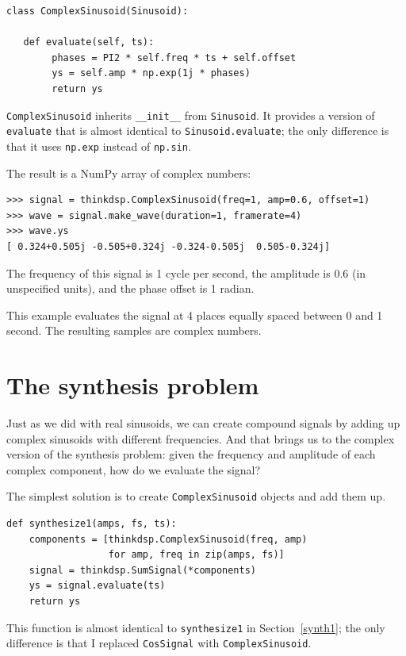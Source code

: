 \documentclass[12pt]{book}
\begin{document}
\begin{verbatim}
class ComplexSinusoid(Sinusoid):

   def evaluate(self, ts):
        phases = PI2 * self.freq * ts + self.offset
        ys = self.amp * np.exp(1j * phases)
        return ys
\end{verbatim}

{\tt ComplexSinusoid} inherits \verb"__init__" from
{\tt Sinusoid}.  It provides a version of {\tt evaluate}
that is almost identical to {\tt Sinusoid.evaluate}; the
only difference is that it uses {\tt np.exp} instead of
{\tt np.sin}.

The result is a NumPy array of complex numbers:

\begin{verbatim}
>>> signal = thinkdsp.ComplexSinusoid(freq=1, amp=0.6, offset=1)
>>> wave = signal.make_wave(duration=1, framerate=4)
>>> wave.ys
[ 0.324+0.505j -0.505+0.324j -0.324-0.505j  0.505-0.324j]
\end{verbatim}

The frequency of this signal is 1 cycle per second, the amplitude
is 0.6 (in unspecified units), and the phase offset is 1 radian.

This example evaluates the signal at 4 places equally spaced between
0 and 1 second.  The resulting samples are complex numbers.


\section{The synthesis problem}

Just as we did with real sinusoids, we can create compound signals
by adding up complex sinusoids with different frequencies.  And that
brings us to the complex version of the synthesis problem: given the
frequency and amplitude of each complex component, how do we evaluate the
signal?

The simplest solution is to create {\tt ComplexSinusoid} objects and
add them up.

\begin{verbatim}
def synthesize1(amps, fs, ts):
    components = [thinkdsp.ComplexSinusoid(freq, amp)
                  for amp, freq in zip(amps, fs)]
    signal = thinkdsp.SumSignal(*components)
    ys = signal.evaluate(ts)
    return ys
\end{verbatim}

This function is almost identical to {\tt synthesize1} in
Section~\ref{synth1}; the only difference is that I replaced
{\tt CosSignal} with {\tt ComplexSinusoid}.
\end{document}
